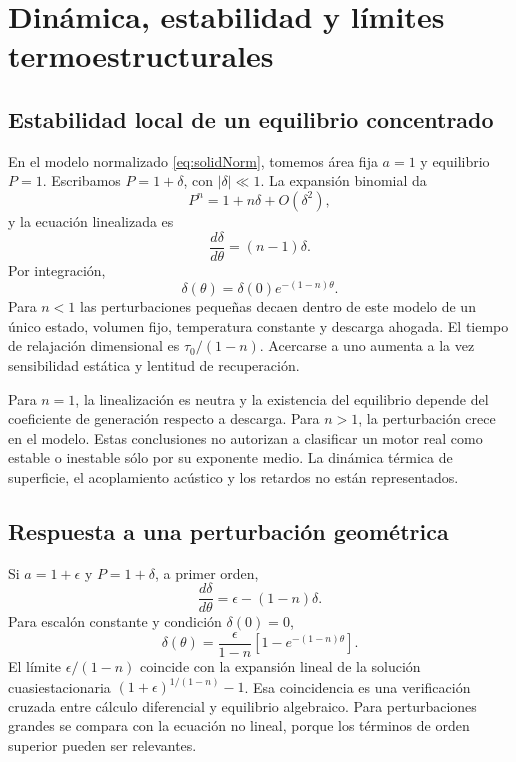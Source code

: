 \chapter{Dinámica, estabilidad y límites termoestructurales}\label{ch:13}
\section{Estabilidad local de un equilibrio concentrado}
En el modelo normalizado \eqref{eq:solidNorm}, tomemos área fija $a=1$ y equilibrio $P=1$. Escribamos $P=1+\delta$, con $|\delta|\ll1$. La expansión binomial da
\[
 P^n=1+n\delta+O(\delta^2),
\]
y la ecuación linealizada es
\[
 \frac{d\delta}{d\theta}=(n-1)\delta.
\]
Por integración,
\begin{equation}\label{eq:solidStability}
 \delta(\theta)=\delta(0)e^{-(1-n)\theta}.
\end{equation}
Para $n<1$ las perturbaciones pequeñas decaen dentro de este modelo de un único estado, volumen fijo, temperatura constante y descarga ahogada. El tiempo de relajación dimensional es $\tau_0/(1-n)$. Acercarse a uno aumenta a la vez sensibilidad estática y lentitud de recuperación.

Para $n=1$, la linealización es neutra y la existencia del equilibrio depende del coeficiente de generación respecto a descarga. Para $n>1$, la perturbación crece en el modelo. Estas conclusiones no autorizan a clasificar un motor real como estable o inestable sólo por su exponente medio. La dinámica térmica de superficie, el acoplamiento acústico y los retardos no están representados.
\section{Respuesta a una perturbación geométrica}
Si $a=1+\epsilon$ y $P=1+\delta$, a primer orden,
\[
 \frac{d\delta}{d\theta}=\epsilon-(1-n)\delta.
\]
Para escalón constante y condición $\delta(0)=0$,
\[
 \delta(\theta)=\frac{\epsilon}{1-n}
 \left[1-e^{-(1-n)\theta}\right].
\]
El límite $\epsilon/(1-n)$ coincide con la expansión lineal de la solución cuasiestacionaria $(1+\epsilon)^{1/(1-n)}-1$. Esa coincidencia es una verificación cruzada entre cálculo diferencial y equilibrio algebraico. Para perturbaciones grandes se compara con la ecuación no lineal, porque los términos de orden superior pueden ser relevantes.
